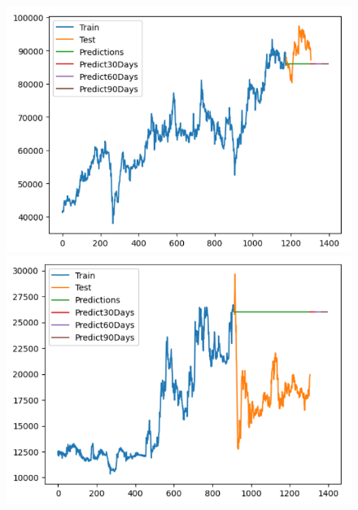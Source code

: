 \begin{figure}[H]
\begin{minipage}{0.15\textwidth}
    \end{minipage}
    \hfill
        \begin{minipage}{0.15\textwidth}
    \centering
    \includegraphics[width=1\textwidth]{resources/chapter-5/newdata1/result/VCB_ARIMA_9-1.png}
    \end{minipage}
    \hfill
    \begin{minipage}{0.15\textwidth}
    \centering
    \includegraphics[width=1\textwidth]{resources/chapter-5/newdata1/result/EIB_ARIMA_7-3.png}
    \end{minipage}
    \hfill
    \begin{minipage}{0.15\textwidth}
    \centering

\end{minipage}
\end{figure}
